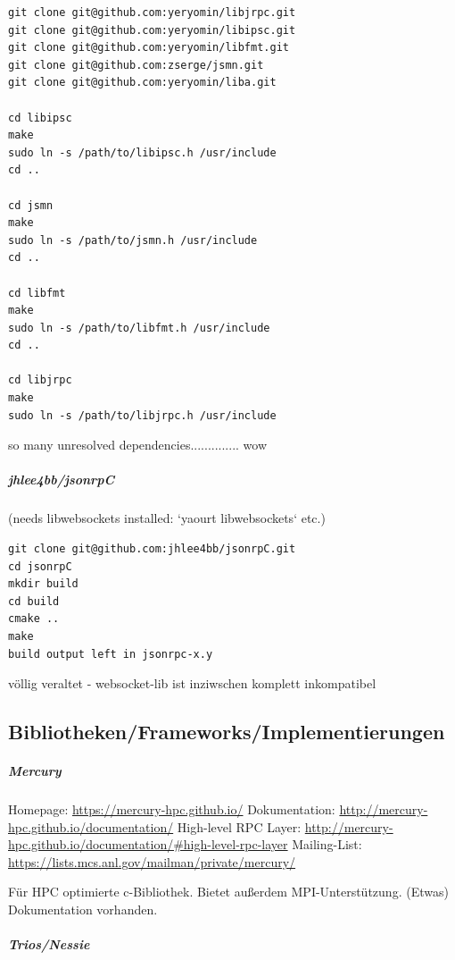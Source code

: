 \documentclass[a4paper,10pt]{article}
\numberwithin{figure}{section}
\numberwithin{table}{section}
\begin{document}
\begin{lstlisting}[frame=single,caption=yeryomin/libjrpc Installation, breaklines=true]
git clone git@github.com:yeryomin/libjrpc.git
git clone git@github.com:yeryomin/libipsc.git
git clone git@github.com:yeryomin/libfmt.git
git clone git@github.com:zserge/jsmn.git
git clone git@github.com:yeryomin/liba.git

cd libipsc
make
sudo ln -s /path/to/libipsc.h /usr/include
cd ..

cd jsmn
make
sudo ln -s /path/to/jsmn.h /usr/include
cd ..

cd libfmt
make
sudo ln -s /path/to/libfmt.h /usr/include
cd ..

cd libjrpc
make
sudo ln -s /path/to/libjrpc.h /usr/include
\end{lstlisting}

so many unresolved dependencies.............. wow

\subparagraph{jhlee4bb/jsonrpC}

(needs libwebsockets installed: `yaourt libwebsockets` etc.)

\begin{lstlisting}[frame=single,caption=jhlee4bb/jsonrpC Installation, breaklines=true]
git clone git@github.com:jhlee4bb/jsonrpC.git
cd jsonrpC
mkdir build
cd build
cmake ..
make
build output left in jsonrpc-x.y
\end{lstlisting}

völlig veraltet - websocket-lib ist inziwschen komplett inkompatibel


\subsection{Bibliotheken/Frameworks/Implementierungen}

\subparagraph{Mercury}

Homepage: \url{https://mercury-hpc.github.io/}
Dokumentation: \url{http://mercury-hpc.github.io/documentation/}
High-level RPC Layer: \url{http://mercury-hpc.github.io/documentation/#high-level-rpc-layer}
Mailing-List: \url{https://lists.mcs.anl.gov/mailman/private/mercury/}

Für HPC optimierte c-Bibliothek.
Bietet außerdem MPI-Unterstützung.
(Etwas) Dokumentation vorhanden.

\subparagraph{Trios/Nessie}
\end{document}
